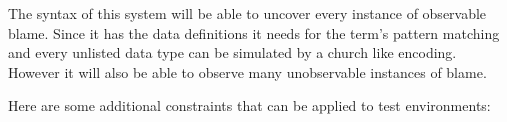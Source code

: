 The syntax of this system will be able to uncover every instance of observable blame.
 Since it has the data definitions it needs for the term's pattern matching and every unlisted data type can be simulated by a church like encoding.
 However it will also be able to observe many unobservable instances of blame.
  
 Here are some additional constraints that can be applied to test environments:
  
  
 









